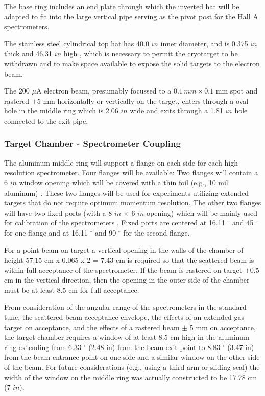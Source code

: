 	The base ring includes an end plate through which the
inverted hat will be adapted to fit into the large vertical pipe serving
as the pivot post for the Hall A spectrometers.

	The stainless steel cylindrical top hat  has
40.0 $in$ inner diameter, and is 0.375 $in$ thick and
46.31 $in$ high , which is necessary to permit the
cryotarget to be withdrawn and to make space available to expose the solid
targets to the electron beam.

   The 200 $\mu$A electron beam, presumably focussed to a \(0.1\, mm\times
0.1\) mm spot and rastered $\pm$5 mm horizontally or vertically on the
target, enters through a oval hole in the middle ring which
is 2.06 $in$ wide and exits through a 1.81 $in$ hole connected to the
exit pipe.

\subsubsection{Target Chamber - Spectrometer Coupling}

   The aluminum middle ring will support a flange on each side for each high
resolution spectrometer. Four flanges will be available: Two flanges will
contain a 6 $in$ window opening which will be covered with a thin foil
(e.g., 10 mil aluminum) .
These two flanges will be used for experiments utilizing
extended  targets that do not require optimum momentum resolution.
The other two flanges will have two fixed ports (with a 8 $in$ $\times$ 6 $in$
opening)
which will be mainly used for calibration of the spectrometers . Fixed ports are
centered at 16.11 $^\circ$ and
45 $^\circ$ for one flange and at 16.11 $^\circ$ and 90 $^\circ$ for the second
flange.

   For a point beam on target a vertical opening in the walls of the chamber
of height 57.15 cm x 0.065 x 2 = 7.43 cm is required so that the scattered
beam is within full acceptance of the spectrometer.
If the beam is rastered on target $\pm$0.5 cm in the vertical direction,
then the opening in the outer side of the chamber must be at least 8.5 cm for
full acceptance.

From consideration of the angular range of the spectrometers in the standard
tune, the scattered beam acceptance envelope, the effects of an
extended gas target on acceptance,
and the effects of a rastered beam $\pm$ 5 mm on acceptance,
the target chamber requires a window of at least 8.5 cm
high in the aluminum ring extending from 6.33 $^\circ$ (2.48 in) from the
beam exit point to 8.83 $^\circ$ (3.47 in) from the beam entrance point on one
side and a similar window on the other side of the beam.
For future considerations (e.g., using a third arm or sliding seal) the
width of the window on the middle ring was actually constructed
to be 17.78 cm (7 $in$).


